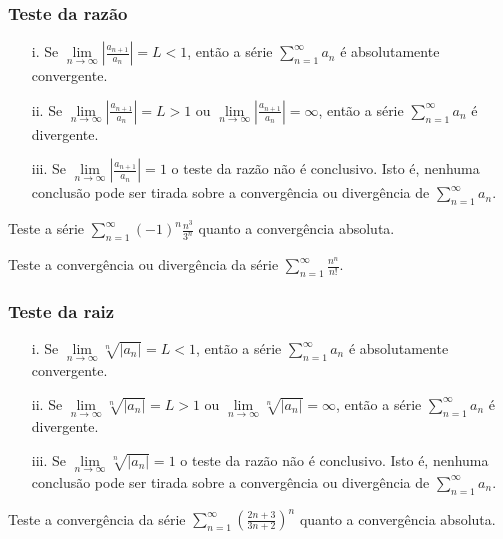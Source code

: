 \subsubsection{Teste da razão} 
\begin{itemize}
	\item[i.]Se $\lim\limits_{n\rightarrow\infty} \left| \frac{a_{n+1}}{a_{n}}\right|=L<1$, então a série $\sum_{n=1}^{\infty}a_{n}$ é absolutamente convergente.
	\item[ii.]Se $\lim\limits_{n\rightarrow\infty} \left| \frac{a_{n+1}}{a_{n}}\right|=L>1$ ou $\lim\limits_{n\rightarrow\infty} \left| \frac{a_{n+1}}{a_{n}}\right|=\infty$, então a série $\sum_{n=1}^{\infty}a_{n}$ é divergente.
	\item[iii.]Se $\lim\limits_{n\rightarrow\infty} \left| \frac{a_{n+1}}{a_{n}}\right|=1$ o teste da razão não é conclusivo. Isto é, nenhuma conclusão pode ser tirada sobre a convergência ou divergência de $\sum_{n=1}^{\infty}a_{n}$. 
\end{itemize} 
\begin{ex}
	Teste a série $\sum_{n=1}^{\infty}(-1)^{n}\frac{n^{3}}{3^{n}}$ quanto a convergência absoluta. 
\end{ex}
\vspace*{5cm}
\begin{ex}
	Teste a convergência ou divergência da série $\sum_{n=1}^{\infty}\frac{n^{n}}{n!}$. 
\end{ex}
\vspace*{5cm}
\subsubsection{Teste da raiz} 
\begin{itemize}
	\item[i.]Se $\lim\limits_{n\rightarrow\infty} \sqrt[n]{\left|a_{n} \right| }=L<1$, então a série $\sum_{n=1}^{\infty}a_{n}$ é absolutamente convergente.
	\item[ii.]Se $\lim\limits_{n\rightarrow\infty} \sqrt[n]{\left|a_{n} \right| }=L>1$ ou $\lim\limits_{n\rightarrow\infty} \sqrt[n]{\left|a_{n} \right| }=\infty$, então a série $\sum_{n=1}^{\infty}a_{n}$ é divergente.
	\item[iii.]Se $\lim\limits_{n\rightarrow\infty} \sqrt[n]{\left|a_{n} \right| }=1$ o teste da razão não é conclusivo. Isto é, nenhuma conclusão pode ser tirada sobre a convergência ou divergência de $\sum_{n=1}^{\infty}a_{n}$. 
\end{itemize}
\begin{ex}
	Teste a convergência da série $\sum_{n=1}^{\infty}(\frac{2n+3}{3n+2})^{n}$ quanto a convergência absoluta. 
\end{ex}









